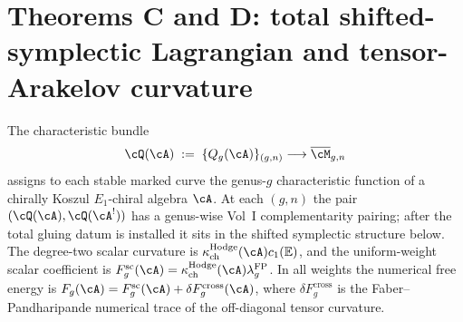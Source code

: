 %
%

\chapter{Theorems C and D: total shifted-symplectic Lagrangian and
tensor-Arakelov curvature}
\label{chap:theorems-C-D-native}

\providecommand{\ClaimStatusProvedHere}{\textsc{ProvedHere}}
\providecommand{\ClaimStatusProvedElsewhere}{\textsc{ProvedElsewhere}}
\providecommand{\ClaimStatusConditional}{\textsc{Conditional}}
\providecommand{\ClaimStatusConjectured}{\textsc{Conjectured}}
\providecommand{\ClaimStatusRetracted}{\textsc{Retracted}}

\providecommand{\kappaCat}{\kappa_{\mathrm{cat}}}
\providecommand{\kappaChHodge}{\kappa_{\mathrm{ch}}^{\mathrm{Hodge}}}
\providecommand{\kappaChHeis}{\kappa_{\mathrm{ch}}^{\mathrm{Heis}}}
\providecommand{\kappaBKM}{\kappa_{\mathrm{BKM}}}
\providecommand{\kappaFiber}{\kappa_{\mathrm{fiber}}}
\providecommand{\Kkappa}{K^{\kappaChHodge}}
\providecommand{\kappaTuple}[1]{\bigl(\kappaCat,\, \kappaChHodge,\, \kappaChHeis,\, \kappaBKM,\, \kappaFiber\bigr)(#1)}
\providecommand{\Deltafive}{\Delta_{5}}
\providecommand{\Phihol}{\Phi_{\mathrm{hol}}}

The characteristic bundle
\[
 \cQ(\cA) \;:=\; \{Q_g(\cA)\}_{(g,n)} \longrightarrow
 \overline{\cM}_{g,n}
\]
assigns to each stable marked curve the genus-$g$ characteristic
function of a chirally Koszul $E_1$-chiral algebra $\cA$. At each
$(g,n)$ the pair $(\cQ(\cA), \cQ(\cA^!))$ has a genus-wise Vol~I
complementarity pairing; after the total gluing datum is installed it
sits in the shifted symplectic structure below. The degree-two scalar
curvature is
$\kappaChHodge(\cA)c_1(\mathbb E)$, and the uniform-weight scalar
coefficient is
$F_g^{\mathrm{sc}}(\cA)
=\kappaChHodge(\cA)\lambda_g^{\mathrm{FP}}$. In all weights the
numerical free energy is
$F_g(\cA)=F_g^{\mathrm{sc}}(\cA)
+\delta F_g^{\mathrm{cross}}(\cA)$, where
$\delta F_g^{\mathrm{cross}}$ is the Faber--Pandharipande numerical
trace of the off-diagonal tensor curvature.

